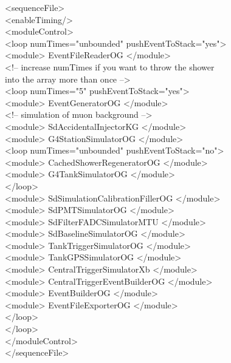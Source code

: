 \begingroup
  \selectfont <sequenceFile>\\
  \null\quad <enableTiming/>\\
  \null\quad <moduleControl>\\
  \null\qquad <loop numTimes="unbounded" pushEventToStack="yes"> \\
  \null\qquad \quad  <module> EventFileReaderOG </module>\\
  \null\qquad \quad  <!-- increase numTimes if you want to throw the shower\\
  \null\qquad \quad    into the array more than once -->\\
           \null \qquad \quad  <loop numTimes="5" pushEventToStack="yes">\\
           \null\qquad \quad \quad    <module> EventGeneratorOG </module>\\
           \null\qquad \quad \quad    <!-- simulation of muon background -->\\
           \null\qquad \quad \quad    <module> SdAccidentalInjectorKG </module>\\
           \null\qquad \quad \quad    <module> G4StationSimulatorOG </module>\\
           \null\qquad \quad \quad    <loop numTimes="unbounded" pushEventToStack="no">\\
           \null\qquad \quad \quad \quad          <module> CachedShowerRegeneratorOG </module>\\
           \null\qquad \quad \quad \quad          <module> G4TankSimulatorOG </module>\\
           \null\qquad \quad \quad    </loop>\\
           \null\qquad \quad \quad    <module> SdSimulationCalibrationFillerOG </module>\\
           \null\qquad \quad \quad    <module> SdPMTSimulatorOG </module>\\
           \null\qquad \quad \quad    <module> SdFilterFADCSimulatorMTU </module>\\
           \null\qquad \quad \quad    <module> SdBaselineSimulatorOG </module>\\
           \null\qquad \quad \quad    <module> TankTriggerSimulatorOG </module>\\
           \null\qquad \quad \quad    <module> TankGPSSimulatorOG </module>\\
           \null\qquad \quad \quad    <module> CentralTriggerSimulatorXb       </module>\\
           \null\qquad \quad \quad    <module> CentralTriggerEventBuilderOG    </module>\\
           \null\qquad \quad \quad    <module> EventBuilderOG                  </module>\\
           \null\qquad \quad \quad    <module> EventFileExporterOG </module>\\
           \null\qquad \quad  </loop>\\
  \null \qquad  </loop>\\
  \null \quad  </moduleControl>\\
  \null \quad  </sequenceFile>\\
\endgroup


